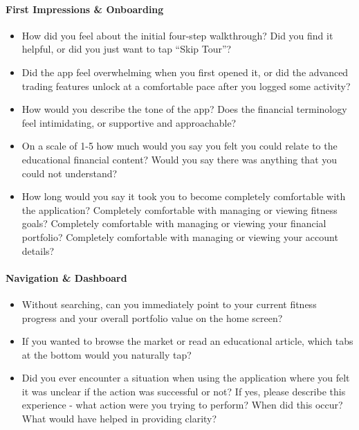 \documentclass[12pt, titlepage]{article}
\begin{document}
\paragraph{First Impressions \& Onboarding}
\begin{itemize}
  \item How did you feel about the initial four-step walkthrough? Did you find it helpful, or did you just want to tap ``Skip Tour''?
  \item Did the app feel overwhelming when you first opened it, or did the advanced trading features unlock at a comfortable pace after you logged some activity?
  \item How would you describe the tone of the app? Does the financial terminology feel intimidating, or supportive and approachable?
  \item On a scale of 1-5 how much would you say you felt you could relate to the educational financial content? Would you say there was anything that you could not understand?
  \item How long would you say it took you to become completely comfortable with the application? Completely comfortable with managing or viewing fitness goals? Completely comfortable with managing or viewing your financial portfolio? Completely comfortable with managing or viewing your account details?
\end{itemize}

\paragraph{Navigation \& Dashboard}
\begin{itemize}
  \item Without searching, can you immediately point to your current fitness progress and your overall portfolio value on the home screen?
  \item If you wanted to browse the market or read an educational article, which tabs at the bottom would you naturally tap?
  \item Did you ever encounter a situation when using the application where you felt it was unclear if the action was successful or not? If yes, please describe this experience - what action were you trying to perform? When did this occur? What would have helped in providing clarity?
\end{itemize}
\end{document}
